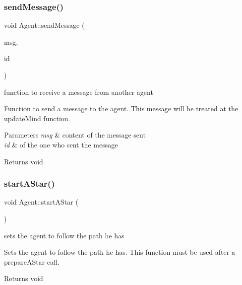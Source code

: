 \subsubsection{\texorpdfstring{send\+Message()}{sendMessage()}}
{\footnotesize\ttfamily void Agent\+::send\+Message (\begin{DoxyParamCaption}\item[{const \mbox{\hyperlink{class_agent_message}{Agent\+Message}} \&}]{msg,  }\item[{const u32}]{id }\end{DoxyParamCaption})}



function to receive a message from another agent 

Function to send a message to the agent. This message will be treated at the update\+Mind function.


\begin{DoxyParams}{Parameters}
{\em msg} & content of the message sent \\
\hline
{\em id} & of the one who sent the message\\
\hline
\end{DoxyParams}
\begin{DoxyReturn}{Returns}
void 
\end{DoxyReturn}
\mbox{\label{class_agent_a23ff42a863144f125494340ca48a5755}} 
\subsubsection{\texorpdfstring{start\+A\+Star()}{startAStar()}}
{\footnotesize\ttfamily void Agent\+::start\+A\+Star (\begin{DoxyParamCaption}{ }\end{DoxyParamCaption})}



sets the agent to follow the path he has 

Sets the agent to follow the path he has. This function must be used after a prepare\+A\+Star call.

\begin{DoxyReturn}{Returns}
void 
\end{DoxyReturn}
\mbox{\label{class_agent_af558d97ffafcfedd4a18c02a8ae2d6e1}} 
